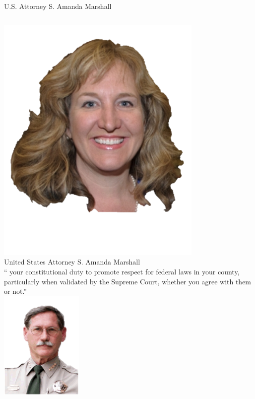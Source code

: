 \begin{frame}{U.S. Attorney S. Amanda Marshall}
    \begin{columns}[onlytextwidth]
            \centering
            \includegraphics[width=0.75\textwidth]{img/amanda-marshall.png} \\
            United States Attorney S. Amanda Marshall \\

            \centering
            `` your constitutional duty to promote respect for federal laws in your county, particularly when validated by the Supreme Court, whether you agree with them or not.'' \\
            \vspace{10pt}
            \includegraphics[width=0.3\textwidth]{img/gil-gilbertson.png} \\
    \end{columns}
\end{frame}

